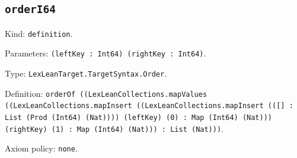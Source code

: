 \documentclass[11pt]{article}
\begin{document}
\subsection*{\texttt{orderI64}}
\noindent Kind: \texttt{definition}.\par
\noindent Parameters: \texttt{(leftKey : Int64) (rightKey : Int64)}.\par
\noindent Type: \texttt{LexLeanTarget.TargetSyntax.Order}.\par
\noindent Definition: \texttt{orderOf ((LexLeanCollections.mapValues ((LexLeanCollections.mapInsert ((LexLeanCollections.mapInsert (([] : List (Prod (Int64) (Nat)))) (leftKey) (0) : Map (Int64) (Nat))) (rightKey) (1) : Map (Int64) (Nat))) : List (Nat)))}.\par
\noindent Axiom policy: \texttt{none}.\par
\end{document}
